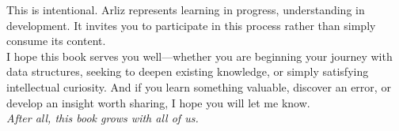 This is intentional. Arliz represents learning in progress, understanding in development. It invites you to participate in this process rather than simply consume its content.\\

I hope this book serves you well—whether you are beginning your journey with data structures, seeking to deepen existing knowledge, or simply satisfying intellectual curiosity. And if you learn something valuable, discover an error, or develop an insight worth sharing, I hope you will let me know.\\

\emph{After all, this book grows with all of us.}\\